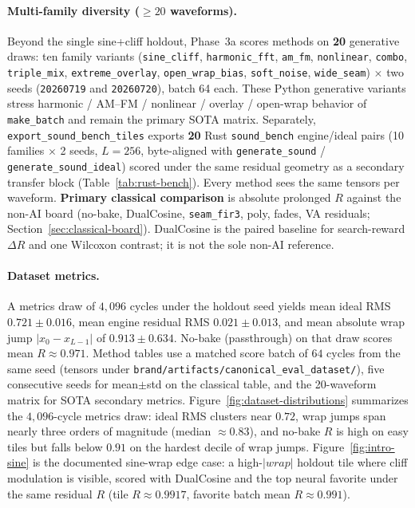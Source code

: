 \paragraph{Multi-family diversity ($\ge 20$ waveforms).}
Beyond the single sine{+}cliff holdout, Phase~3a scores methods on \textbf{20} generative draws: ten family variants (\texttt{sine\_cliff}, \texttt{harmonic\_fft}, \texttt{am\_fm}, \texttt{nonlinear}, \texttt{combo}, \texttt{triple\_mix}, \texttt{extreme\_overlay}, \texttt{open\_wrap\_bias}, \texttt{soft\_noise}, \texttt{wide\_seam}) $\times$ two seeds (\texttt{20260719} and \texttt{20260720}), batch 64 each.
These Python generative variants stress harmonic / AM--FM / nonlinear / overlay / open-wrap behavior of \texttt{make\_batch} and remain the primary SOTA matrix.
Separately, \texttt{export\_sound\_bench\_tiles} exports \textbf{20} Rust \texttt{sound\_bench} engine/ideal pairs (10 families $\times$ 2 seeds, $L{=}256$, byte-aligned with \texttt{generate\_sound} / \texttt{generate\_sound\_ideal}) scored under the same residual geometry as a secondary transfer block (Table~\ref{tab:rust-bench}).
Every method sees the same tensors per waveform.
\textbf{Primary classical comparison} is absolute prolonged $R$ against the non-AI board (no-bake, DualCosine, \texttt{seam\_fir3}, poly, fades, VA residuals; Section~\ref{sec:classical-board}).
DualCosine is the paired baseline for search-reward $\Delta R$ and one Wilcoxon contrast; it is not the sole non-AI reference.

\paragraph{Dataset metrics.}
A metrics draw of $4{,}096$ cycles under the holdout seed yields mean ideal RMS $0.721\pm0.016$, mean engine residual RMS $0.021\pm0.013$, and mean absolute wrap jump $|x_0-x_{L-1}|$ of $0.913\pm0.634$.
No-bake (passthrough) on that draw scores mean $R\approx0.971$.
Method tables use a matched score batch of $64$ cycles from the same seed (tensors under \texttt{brand/artifacts/canonical\_eval\_dataset/}), five consecutive seeds for mean$\pm$std on the classical table, and the 20-waveform matrix for SOTA secondary metrics.
Figure~\ref{fig:dataset-distributions} summarizes the $4{,}096$-cycle metrics draw: ideal RMS clusters near $0.72$, wrap jumps span nearly three orders of magnitude (median $\approx 0.83$), and no-bake $R$ is high on easy tiles but falls below $0.91$ on the hardest decile of wrap jumps.
Figure~\ref{fig:intro-sine} is the documented sine-wrap edge case: a high-$|wrap|$ holdout tile where cliff modulation is visible, scored with DualCosine and the top neural favorite under the same residual $R$ (tile $R\approx0.9917$, favorite batch mean $R\approx0.991$).

